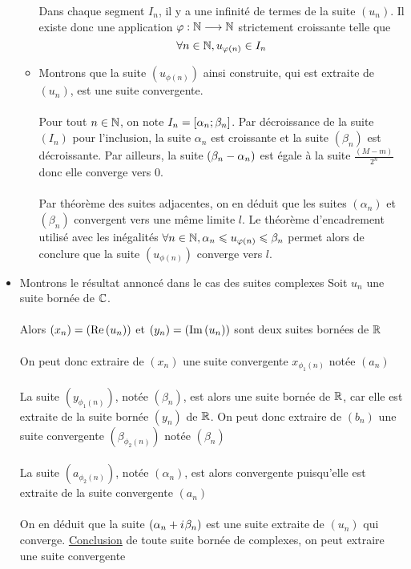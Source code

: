 \begin{dem}
\begin{itemize}
\begin{itemize}
\begin{enumerate}
            \end{enumerate}
            Dans chaque segment \(I_n\), il y a une infinité de termes de la suite \((u_n)\). Il existe donc une application \(\varphi : \mathbb{N} \longrightarrow \mathbb{N}\) strictement croissante telle que 
            \[\forall n \in \mathbb{N}, u_{\varphi(n)} \in I_n\]
            \item Montrons que la suite \((u_{\phi(n)})\) ainsi construite, qui est extraite de \((u_n)\), est une suite convergente.\\~\\
            Pour tout  \(n \in \mathbb{N}\), on note \(I_n = \left[\alpha_n;\beta_n\right]\). Par décroissance de la suite \((I_n)\) pour l'inclusion, la suite \(\alpha_n\) est croissante et la suite \((\beta_n)\) est décroissante. Par ailleurs, la suite \(\left(\beta_n - \alpha_n\right)\) est égale à la suite \(\frac{(M-m)}{2^n}\) donc elle converge vers \(0\).\\~\\
            Par théorème des suites adjacentes, on en déduit que les suites \((\alpha_n)\) et \((\beta_n)\) convergent vers une même limite \(l\). Le théorème d'encadrement utilisé avec les inégalités \(\forall n \in \mathbb{N},\alpha_n \leqslant u_{\varphi(n)}\leqslant \beta_n\) permet alors de conclure que la suite \((u_{\phi(n)})\) converge vers \(l\).
        \end{itemize}
    \item Montrons le résultat annoncé dans le cas des suites complexes
    Soit \(u_n\) une suite bornée de \(\mathbb{C}\).\\~\\
    Alors \((x_n) = (\operatorname{Re}\left(u_n\right))\) et \((y_n) = (\operatorname{Im}\left(u_n\right))\) sont deux suites bornées de \(\mathbb{R}\)\\~\\
    On peut donc extraire de \((x_n)\) une suite convergente \(x_{\phi_1(n)}\) notée \((a_n)\)\\~\\
    La suite \((y_{\phi_1(n)})\), notée \((\beta_n)\), est alors une suite bornée de \(\mathbb{R}\), car elle est extraite de la suite bornée \((y_n)\) de \(\mathbb{R}\). On peut donc extraire de \((b_n)\) une suite convergente \((\beta_{\phi_2(n)})\) notée \((\beta_n)\)\\~\\
    La suite \((a_{\phi_2(n)})\), notée \((\alpha_n)\), est alors convergente puisqu'elle est extraite de la suite convergente \((a_n)\)\\~\\
    On en déduit que la suite \((\alpha_n + i\mkern1mu \beta_n)\) est une suite extraite de \((u_n)\) qui converge.
    \underline{Conclusion} de toute suite bornée de complexes, on peut extraire une suite convergente
    \end{itemize}
\end{dem}

